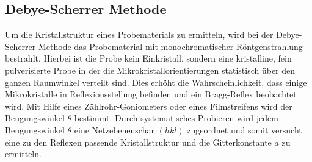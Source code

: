 \subsection{Debye-Scherrer Methode}
\label{subsec:Methoden}
Um die Kristallstruktur eines Probematerials
zu ermitteln, wird bei der Debye-Scherrer Methode
das Probematerial mit monochromatischer
Röntgenstrahlung bestrahlt.
Hierbei ist die Probe kein
Einkristall, sondern eine
kristalline, fein pulverisierte Probe
in der die Mikrokristallorientierungen statistisch
über den ganzen Raumwinkel verteilt sind.
Dies erhöht die Wahrscheinlichkeit, dass
einige Mikrokristalle in Reflexionsstellung
befinden und ein Bragg-Reflex beobachtet wird.
Mit Hilfe eines
Zählrohr-Goniometers oder
eines Filmstreifens wird der Beugungswinkel $\theta$
bestimmt. Durch systematisches Probieren wird
jedem Beugungswinkel $\theta$ eine Netzebenenschar
${(h k l)}$ zugeordnet und somit versucht
eine zu den Reflexen passende Kristallstruktur und
die Gitterkonstante $a$
zu ermitteln.
